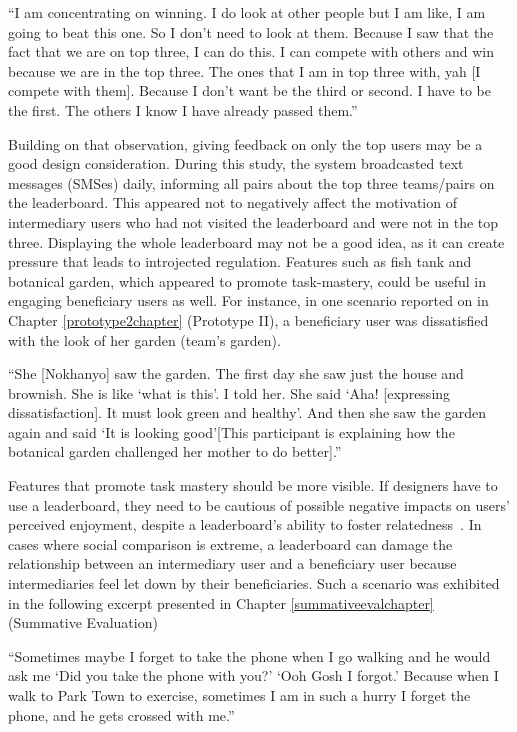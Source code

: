  {``I am concentrating on winning. I do look at other people but I am like, I am going to beat this one. So I don't need to look at them. Because I saw that the fact that we are on top three, I can do this. I can compete with others and win because we are in the top three. The ones that I am in top three with, yah [I compete with them]. Because I don't want be the third or second. I have to be the first. The others I know I have already passed them.''}

Building on that observation, giving feedback on only the top users may be a good design consideration. During this study, the system broadcasted text messages (SMSes) daily, informing all pairs about the top three teams/pairs on the leaderboard. This appeared not to negatively affect the motivation of intermediary users who had not visited the leaderboard and were not in the top three. Displaying the whole leaderboard may not be a good idea, as it can create pressure that leads to introjected regulation. Features such as fish tank and botanical garden, which appeared to promote task-mastery, could be useful in engaging beneficiary users as well. For instance, in one scenario reported on in Chapter \ref{prototype2chapter} (Prototype II),  a beneficiary user was dissatisfied with the look of her garden (team's garden). 

 {``She [Nokhanyo] saw the garden. The first day she saw just the house and brownish. She is like `what is this'. I told her. She said `Aha! [expressing dissatisfaction]. It must look green and healthy'. And then she saw the garden again and said `It is looking good'[This participant is explaining how the botanical garden challenged her mother to do better].''} 

Features that promote task mastery should be more visible. If designers have to use a leaderboard, they need to be cautious of possible negative impacts on users' perceived enjoyment, despite a leaderboard's ability to foster relatedness~\citep{sailer2013:psychological}. In cases where social comparison is extreme, a leaderboard can damage the relationship between an intermediary user and a beneficiary user because intermediaries feel let down by their beneficiaries. Such a scenario was exhibited in the following excerpt presented in Chapter \ref{summativeevalchapter} (Summative Evaluation)
 
 {``Sometimes maybe I forget to take the phone when I go walking and he would ask me `Did you take the phone with you?' `Ooh Gosh I forgot.'  Because when I walk to Park Town to exercise, sometimes  I am in such a hurry I forget the phone, and he gets crossed with me.''} 

